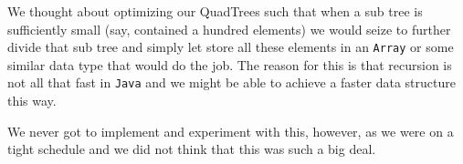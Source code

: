 We thought about optimizing our QuadTrees such that when a sub tree is sufficiently small (say, contained a hundred elements) we would seize to further divide that sub tree and simply let store all these elements in an \texttt{Array} or some similar data type that would do the job. The reason for this is that recursion is not all that fast in \texttt{Java} and we might be able to achieve a faster data structure this way.

We never got to implement and experiment with this, however, as we were on a tight schedule and we did not think that this was such a big deal.